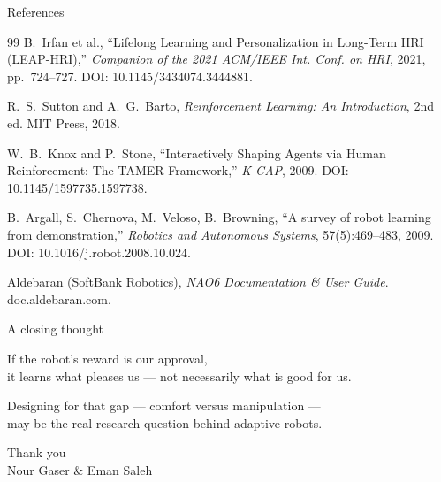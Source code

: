 \documentclass[aspectratio=169,10pt]{beamer}
\begin{document}
\begin{frame}[allowframebreaks]{References}
\begin{thebibliography}{99}
     B.\ Irfan et al.,
      ``Lifelong Learning and Personalization in Long-Term HRI (LEAP-HRI),''
      \emph{Companion of the 2021 ACM/IEEE Int. Conf. on HRI}, 2021, pp.\ 724--727.
      DOI: 10.1145/3434074.3444881.

     R.\ S.\ Sutton and A.\ G.\ Barto,
      \emph{Reinforcement Learning: An Introduction}, 2nd ed. MIT Press, 2018.

     W.\ B.\ Knox and P.\ Stone,
      ``Interactively Shaping Agents via Human Reinforcement: The TAMER Framework,''
      \emph{K-CAP}, 2009. DOI: 10.1145/1597735.1597738.

     B.\ Argall, S.\ Chernova, M.\ Veloso, B.\ Browning,
      ``A survey of robot learning from demonstration,''
      \emph{Robotics and Autonomous Systems}, 57(5):469--483, 2009.
      DOI: 10.1016/j.robot.2008.10.024.

     Aldebaran (SoftBank Robotics),
      \emph{NAO6 Documentation \& User Guide}. doc.aldebaran.com.

  \end{thebibliography}
\end{frame}

\begin{frame}[standout]
  A closing thought
  \vspace{1.2em}

  {\large If the robot's reward is our approval,\\
  it learns what pleases us --- not necessarily what is good for us.}
  \vspace{1.2em}

  {\normalsize Designing for that gap --- comfort versus manipulation --- \\ may be the real research question behind adaptive robots.}
\end{frame}

\begin{frame}[standout]
  Thank you\\[0.4em]
  {\normalsize Nour Gaser \& Eman Saleh}
\end{frame}

\appendix
\end{document}
